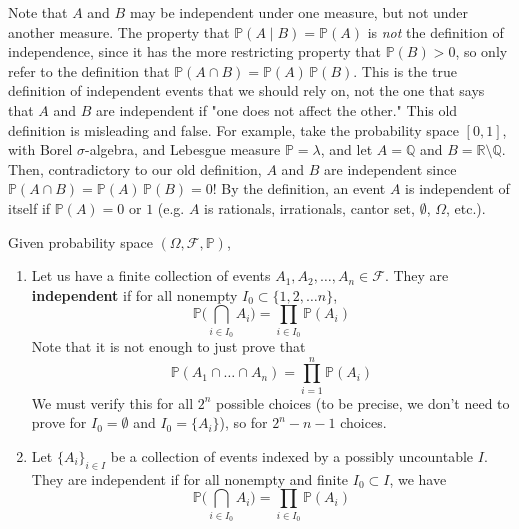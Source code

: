   Note that $A$ and $B$ may be independent under one measure, but not under another measure. The property that $\mathbb{P}(A \mid B) = \mathbb{P}(A)$ is \textit{not} the definition of independence, since it has the more restricting property that $\mathbb{P}(B) > 0$, so only refer to the definition that $\mathbb{P}(A \cap B) = \mathbb{P}(A) \, \mathbb{P}(B)$. This is the true definition of independent events that we should rely on, not the one that says that $A$ and $B$ are independent if "one does not affect the other." This old definition is misleading and false. For example, take the probability space $[0, 1]$, with Borel $\sigma$-algebra, and Lebesgue measure $\mathbb{P} = \lambda$, and let $A = \mathbb{Q}$ and $B = \mathbb{R} \setminus \mathbb{Q}$. Then, contradictory to our old definition, $A$ and $B$ are independent since $\mathbb{P}(A \cap B) = \mathbb{P}(A) \, \mathbb{P}(B) = 0$! By the definition, an event $A$ is independent of itself if $\mathbb{P}(A) = 0$ or $1$ (e.g. $A$ is rationals, irrationals, cantor set, $\emptyset$, $\Omega$, etc.). 

  \begin{definition}
    Given probability space $(\Omega, \mathcal{F}, \mathbb{P})$, 
    \begin{enumerate}
      \item Let us have a finite collection of events $A_1, A_2, \ldots, A_n \in \mathcal{F}$. They are \textbf{independent} if for all nonempty $I_0 \subset \{1, 2, \ldots n\}$, 
      \begin{equation}
        \mathbb{P} \bigg( \bigcap_{i \in I_0} A_i \bigg) = \prod_{i \in I_0} \mathbb{P}(A_i)
      \end{equation}
      Note that it is not enough to just prove that 
      \begin{equation}
        \mathbb{P}(A_1 \cap \ldots \cap A_n) = \prod_{i=1}^n \mathbb{P}(A_i)
      \end{equation}
      We must verify this for all $2^n$ possible choices (to be precise, we don't need to prove for $I_0 = \emptyset$ and $I_0 = \{A_i\}$), so for $2^n - n - 1$ choices. 
      
      \item Let $\{A_i\}_{i \in I}$ be a collection of events indexed by a possibly uncountable $I$. They are independent if for all nonempty and finite $I_0 \subset I$, we have 
      \begin{equation}
        \mathbb{P} \bigg( \bigcap_{i \in I_0} A_i \bigg) = \prod_{i \in I_0} \mathbb{P}(A_i)
      \end{equation}
    \end{enumerate}
  \end{definition}

